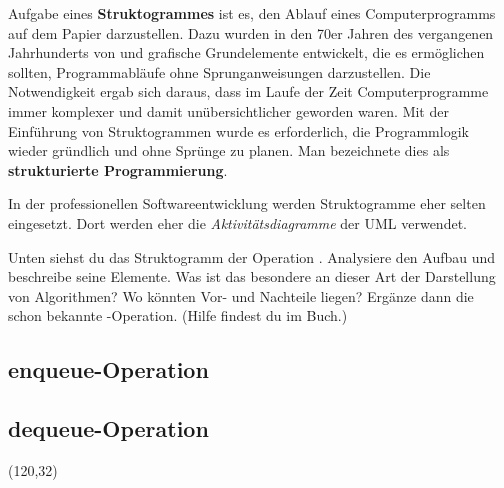 \documentclass[10pt, a4paper]{arbeitsblatt}
\begin{document}
\ReiheTitel

\begin{infobox}
	Aufgabe eines \textbf{Struktogrammes} ist es, den Ablauf eines Computerprogramms
	auf dem Papier darzustellen. Dazu wurden in den 70er Jahren des vergangenen
	Jahrhunderts von  und  grafische
	Grundelemente entwickelt, die es ermöglichen sollten, Programmabläufe ohne
	Sprunganweisungen darzustellen. Die Notwendigkeit ergab sich daraus, dass im
	Laufe der Zeit Computerprogramme immer komplexer und damit unübersichtlicher
	geworden waren. Mit der Einführung von Struktogrammen wurde es erforderlich,
	die Programmlogik wieder gründlich und ohne Sprünge zu planen. Man bezeichnete
	dies als \textbf{strukturierte Programmierung}.

	In der professionellen Softwareentwicklung werden Struktogramme eher selten
	eingesetzt. Dort werden eher die \emph{Aktivitätsdiagramme} der UML verwendet.
\end{infobox}

\begin{aufgabe}[subtitle=Operationen der Schlange]
Unten siehst du das Struktogramm der Operation
. Analysiere den Aufbau und beschreibe seine Elemente. Was ist
das besondere an dieser Art der Darstellung von Algorithmen? Wo könnten Vor-
und Nachteile liegen? Ergänze dann die schon bekannte
-Operation. (Hilfe findest du im Buch.)
\end{aufgabe}

\subsection*{enqueue-Operation}
\begin{rahmen}
	\vspace{5cm}
\end{rahmen}

\subsection*{dequeue-Operation}

\begin{center}
	\ttfamily\small
	\begin{struktogramm}(120,32)
		\change
		\change
		\ifend
		\ifend
	\end{struktogramm}
\end{center}
\end{document}
